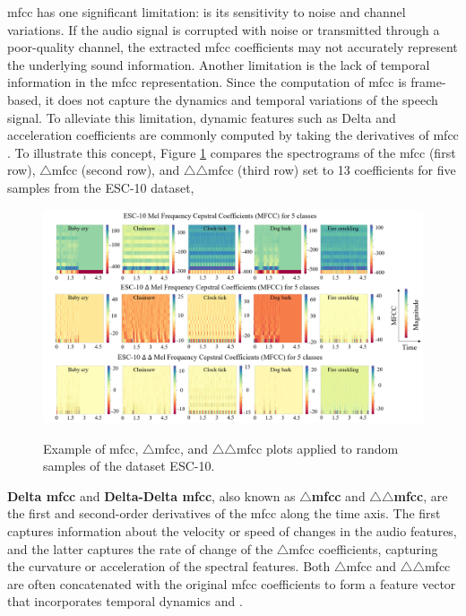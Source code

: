 \gls{mfcc} has one significant limitation: is its sensitivity to noise and channel variations. If the audio signal is corrupted with noise or transmitted through a poor-quality channel, the extracted \gls{mfcc} coefficients may not accurately represent the underlying sound information. Another limitation is the lack of temporal information in the \gls{mfcc} representation. Since the computation of \gls{mfcc} is frame-based, it does not capture the dynamics and temporal variations of the speech signal. To alleviate this limitation, dynamic features such as Delta and acceleration coefficients are commonly computed by taking the derivatives of \gls{mfcc} \cite{Gold2011}. To illustrate this concept, Figure \ref{fig:frmwk_spectral_features_mfcc} compares the spectrograms of the \gls{mfcc} (first row), $\triangle$\gls{mfcc} (second row), and $\triangle\triangle$\gls{mfcc} (third row) set to 13 coefficients for five samples from the ESC-10 dataset, 

\begin{figure}[htbp]
    \raggedright
        \caption{Example of \gls{mfcc}, $\triangle$\gls{mfcc}, and $\triangle\triangle$\gls{mfcc} plots applied to random samples of the dataset ESC-10.}
        \includegraphics[width=1.0\textwidth]{resources/images/030-theoretical_framework/Framework_spectral_features_mfcc.png}
        \label{fig:frmwk_spectral_features_mfcc}
\end{figure}

\textbf{Delta \gls{mfcc}} and \textbf{Delta-Delta \gls{mfcc}}, also known as \textbf{$\triangle$\gls{mfcc}} and \textbf{$\triangle\triangle$\gls{mfcc}}, are the first and second-order derivatives of the \gls{mfcc} along the time axis. The first captures information about the velocity or speed of changes in the audio features, and the latter captures the rate of change of the $\triangle$\gls{mfcc} coefficients, capturing the curvature or acceleration of the spectral features. Both $\triangle$\gls{mfcc} and $\triangle\triangle$\gls{mfcc} are often concatenated with the original \gls{mfcc} coefficients to form a feature vector that incorporates temporal dynamics \cite{Bountourakis2019} and \cite{Tang2018}. 



